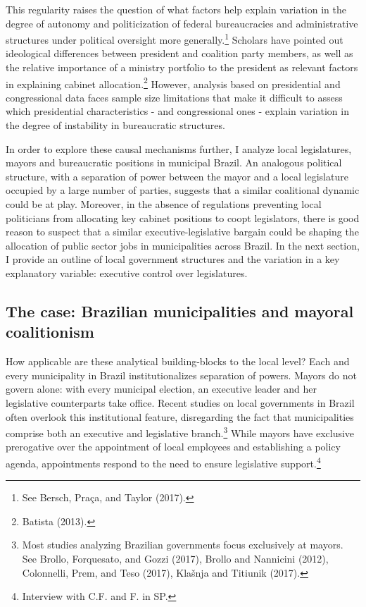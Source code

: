 \documentclass[12pt,]{article}
\let\rmarkdownfootnote\footnote%
\def\footnote{\protect\rmarkdownfootnote}
\begin{document}
This regularity raises the question of what factors help explain
variation in the degree of autonomy and politicization of federal
bureaucracies and administrative structures under political oversight
more generally.\footnote{See Bersch, Praça, and Taylor (2017).} Scholars
have pointed out ideological differences between president and coalition
party members, as well as the relative importance of a ministry
portfolio to the president as relevant factors in explaining cabinet
allocation.\footnote{Batista (2013).} However, analysis based on
presidential and congressional data faces sample size limitations that
make it difficult to assess which presidential characteristics - and
congressional ones - explain variation in the degree of instability in
bureaucratic structures.

In order to explore these causal mechanisms further, I analyze local
legislatures, mayors and bureaucratic positions in municipal Brazil. An
analogous political structure, with a separation of power between the
mayor and a local legislature occupied by a large number of parties,
suggests that a similar coalitional dynamic could be at play. Moreover,
in the absence of regulations preventing local politicians from
allocating key cabinet positions to coopt legislators, there is good
reason to suspect that a similar executive-legislative bargain could be
shaping the allocation of public sector jobs in municipalities across
Brazil. In the next section, I provide an outline of local government
structures and the variation in a key explanatory variable: executive
control over legislatures.

\hypertarget{the-case-brazilian-municipalities-and-mayoral-coalitionism}{%
\subsection{The case: Brazilian municipalities and mayoral
coalitionism}\label{the-case-brazilian-municipalities-and-mayoral-coalitionism}}

How applicable are these analytical building-blocks to the local level?
Each and every municipality in Brazil institutionalizes separation of
powers. Mayors do not govern alone: with every municipal election, an
executive leader and her legislative counterparts take office. Recent
studies on local governments in Brazil often overlook this institutional
feature, disregarding the fact that municipalities comprise both an
executive and legislative branch.\footnote{Most studies analyzing
  Brazilian governments focus exclusively at mayors. See Brollo,
  Forquesato, and Gozzi (2017), Brollo and Nannicini (2012), Colonnelli,
  Prem, and Teso (2017), Klašnja and Titiunik (2017).} While mayors have
exclusive prerogative over the appointment of local employees and
establishing a policy agenda, appointments respond to the need to ensure
legislative support.\footnote{Interview with C.F. and F. in SP.}
\end{document}
